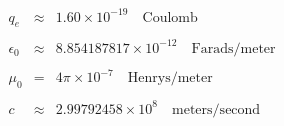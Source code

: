 \begin{eqnarray*}
q_e  &\approx&  1.60 \times 10^{-19} \quad \mathrm{Coulomb} \\
 & & \\
\epsilon_0  &\approx&  8.854187817 \times 10^{-12} \quad \mathrm{Farads/meter} \\
 & & \\
\mu_0  &=&  4\pi \times 10^{-7} \quad \mathrm{Henrys/meter} \\
 & & \\
c  &\approx&  2.99792458 \times 10^8 \quad \mathrm{meters/second}
\end{eqnarray*}

